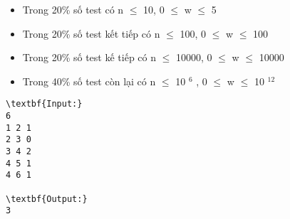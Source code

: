 \begin{itemize}
	\item Trong 20\% số test có n  $\le$  10, 0  $\le$  w  $\le$  5
	\item Trong 20\% số test kết tiếp có n  $\le$  100, 0  $\le$  w  $\le$  100
	\item Trong 20\% số test kế tiếp có n  $\le$  10000, 0  $\le$  w  $\le$  10000
	\item Trong 40\% số test còn lại có n  $\le$  10 $^ 6 $ , 0  $\le$  w  $\le$  10 $^ 12 $
\end{itemize}
\begin{verbatim}
\textbf{Input:}
6
1 2 1
2 3 0
3 4 2
4 5 1
4 6 1

\textbf{Output:}
3\end{verbatim}